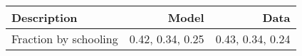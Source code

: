 \begin{tabular}{lrr}
\hline
Description & Model  & Data  \\
\hline
Fraction by schooling & 0.42, 0.34, 0.25  & 0.43, 0.34, 0.24  \\
\hline
\end{tabular}%
